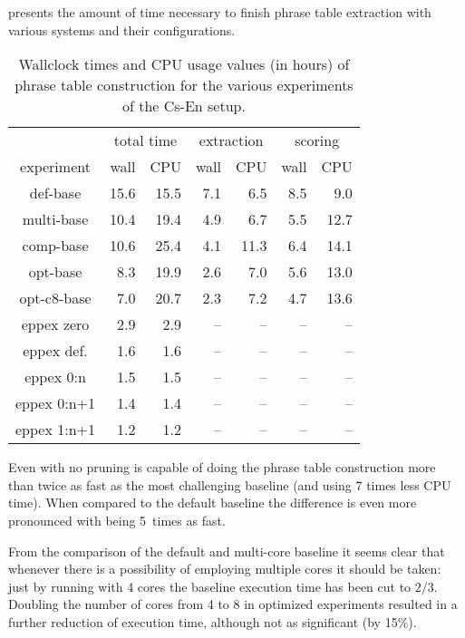  presents the amount of time necessary to finish
phrase table extraction with various systems and their configurations.

\begin{table}[ht]
\centering
\begin{tabular}{ | c | r r | r r | r r | }
\hline
 & \multicolumn{2}{|c|}{total time} & \multicolumn{2}{|c|}{extraction} & \multicolumn{2}{|c|}{scoring} \\
experiment & wall & CPU & wall & CPU & wall & CPU \\
\hline
\hline
def-base      & 15.6 & 15.5 & 7.1 & 6.5 & 8.5 & 9.0 \\
multi-base    & 10.4 & 19.4 & 4.9 & 6.7 & 5.5 & 12.7 \\
comp-base     & 10.6 & 25.4 & 4.1 & 11.3 & 6.4 & 14.1 \\
opt-base      & 8.3 & 19.9 & 2.6 & 7.0 & 5.6 & 13.0 \\
opt-c8-base   & 7.0 & 20.7 & 2.3 & 7.2 & 4.7 & 13.6 \\
eppex zero    & 2.9 & 2.9 & -- & -- & -- & -- \\
\hline
eppex def.    & 1.6 & 1.6 & -- & -- & -- & -- \\
eppex 0:n     & 1.5 & 1.5 & -- & -- & -- & -- \\
eppex 0:n+1   & 1.4 & 1.4 & -- & -- & -- & -- \\
eppex 1:n+1   & 1.2 & 1.2 & -- & -- & -- & -- \\
\hline
\end{tabular}
\caption{\label{cs-en-wmt13-time-benchmarks}
Wallclock times and CPU usage values (in hours) of phrase table
construction for the various experiments of the Cs-En setup.}
\end{table}

Even with no pruning \eppex{} is capable of doing the phrase table construction more
than twice as fast as the most challenging baseline (and using 7 times less CPU time).
When compared to the default baseline the difference is even more pronounced with \eppex{}
being 5~times as fast.

From the comparison of the default and multi-core baseline it seems clear that whenever there
is a possibility of employing multiple cores it should be taken: just by running with 4 cores
the baseline execution time has been cut to $2/3$.
Doubling the number of cores from 4 to 8 in optimized experiments resulted in a further reduction
of execution time, although not as significant (by 15\%).

